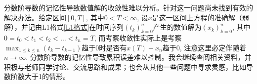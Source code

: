 分数阶导数的记忆性导致数值解的收敛性难以分析。针对这一问题尚未找到有效的解决办法。给定区间$[0,T]$, 其中$0<T<\infty$, 设$x$是这一区间上方程的准确解（弱解），并记由L1格式\eqref{L1格式}在时间序列$\left(t_k\right)_{k=0}^n$产生的数值解为$\left(x_k\right)_{k=0}^n$, 其中$0=t_0<t_1<t_2<\dots<t_n=T$, 而考察收敛性实际上是考察$\max_{1\leqslant k\leqslant n} \left(t_k-t_{k-1}\right)$趋于0时是否有$x(T)-x_n$趋于0, 注意这里必定伴随着$n\to \infty$. 分数阶导数的记忆性导致累积误差难以控制。我会继续查阅相关资料，并积极与老师同学讨论、交流思路和成果；也会从其他一些问题中寻求灵感，比如导数阶数大于1的情形。